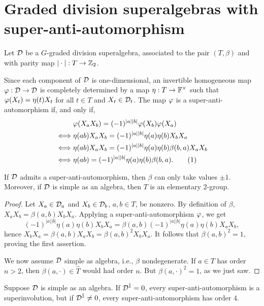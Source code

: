 \documentclass{amsbook}
\newcommand\numberthis{\addtocounter{equation}{1}\tag{\theequation}}
\begin{document}
\section{Graded division superalgebras with super-anti-automorphism}


Let $\mathcal{D}$ be a $G$-graded division superalgebra, associated to the pair $(T, \beta)$ and with parity map $| \cdot |: T \to \mathbb{Z}_2$.

Since each component of $\mathcal{D}$ is one-dimensional, an invertible homogeneous map $\varphi: \mathcal{D} \to \mathcal{D}$ is completely determined by a map $\eta: T \to \mathbb{F}^\times$ such that $\varphi(X_t) = \eta(t) X_t$ for all $t\in T$ and $X_t\in \mathcal{D}_t$.
The map $\varphi$ is a super-anti-automorphism if, and only if,
%
\begin{align*}
    &\vphi(X_a X_b) = (-1)^{|a||b|} \vphi(X_b) \vphi(X_a)\\ \iff& \eta(ab)X_a X_b = (-1)^{|a||b|} \eta(a) \eta(b) X_b X_a\\ \iff& \eta(ab)X_a X_b = (-1)^{|a||b|} \eta(a) \eta(b) \beta(b,a) X_a X_b\\ \iff& \eta(ab) = (-1)^{|a||b|} \eta(a) \eta(b) \beta(b,a). \numberthis \label{eq:eta-super-anti-auto}
\end{align*}

\begin{prop}
    If $\mathcal{D}$ admits a super-anti-automorphism, then $\beta$ can only take values $\pm 1$.
    Moreover, if $\mathcal{D}$ is simple as an algebra, then $T$ is an elementary $2$-group.
\end{prop}

\begin{proof}
    Let $X_a\in \mathcal{D}_a$ and $X_b\in \mathcal{D}_b$, $a,b\in T$, be nonzero.
    By definition of $\beta$, $X_a X_b = \beta(a,b) X_b X_a$.
    Applying a super-anti-automorphism $\varphi$, we get \[(-1)^{|a||b|} \eta(a) \eta(b) X_b X_a = \beta(a,b) (-1)^{|a||b|} \eta(a) \eta(b) X_a X_b,\] hence $X_b X_a = \beta(a,b) X_a X_b = \beta(a,b)^2 X_b X_a$.
    It follows that $\beta(a,b)^2 = 1$, proving the first assertion.
    
    We now assume $\mathcal{D}$ simple as algebra, i.e., $\beta$ nondegenerate.
    If $a\in T$ has order $n>2$, then $\beta(a, \cdot)\in \widehat T$ would had order $n$.
    But $\beta(a, \cdot )^2 =1$, as we just saw.
\end{proof}

\begin{cor}\label{cor:super-anti-order-4}
    Suppose $\mathcal{D}$ is simple as an algebra.
    If $\mathcal{D}^{\bar1} = 0$, every super-anti-automorphism is a superinvolution, but if $\mathcal{D}^{\bar1} \neq 0$, every super-anti-automorphism has order $4$.
\end{cor}
\end{document}
